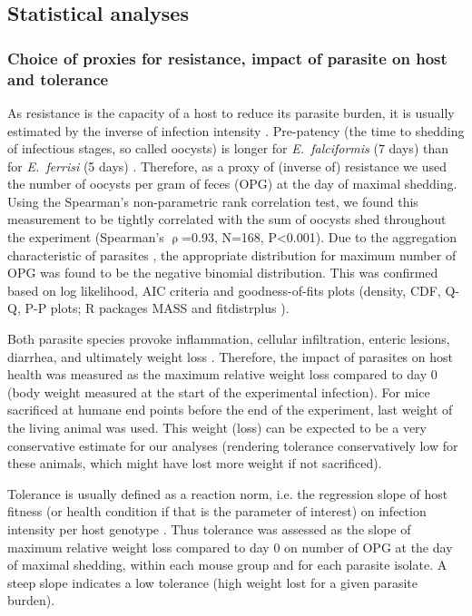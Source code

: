 \subsection{Statistical analyses}

\subsubsection{Choice of proxies for resistance, impact of parasite on host and tolerance}
As resistance is the capacity of a host to reduce its parasite burden, it is usually estimated by the inverse of infection intensity \citep{raaberg_decomposing_2009}. Pre-patency (the time to shedding of infectious stages, so called oocysts) is longer for \textit{E.~falciformis} (7 days) than for \textit{E.~ferrisi} (5 days) \citep{al-khlifeh_eimeria_2019}. Therefore, as a proxy of (inverse of) resistance we used the number of oocysts per gram of feces (OPG) at the day of maximal shedding. Using the Spearman's non-parametric rank correlation test, we found this measurement to be tightly correlated with the sum of oocysts shed throughout the experiment (Spearman's $\uprho$=0.93, N=168, P<0.001). Due to the aggregation characteristic of parasites \citep{shaw_patterns_1995}, the appropriate distribution for maximum number of OPG was found to be the negative binomial distribution. This was confirmed based on log likelihood, AIC criteria and goodness-of-fits plots (density, CDF, Q-Q, P-P plots; R packages MASS \citep{venables_modern_2002} and fitdistrplus \citep{delignette-muller_fitdistrplus_2015}). \par

Both parasite species provoke inflammation, cellular infiltration, enteric lesions, diarrhea, and ultimately weight loss \citep{ankrom_life_1975, ehret_dual_2017, schito_comparison_1996, al-khlifeh_eimeria_2019}. Therefore, the impact of parasites on host health was measured as the maximum relative weight loss compared to day 0 (body weight measured at the start of the experimental infection). For mice sacrificed at humane end points before the end of the experiment, last weight of the living animal was used. This weight (loss) can be expected to be a very conservative estimate for our analyses (rendering tolerance conservatively low for these animals, which might have lost more weight if not sacrificed). \par

Tolerance is usually defined as a reaction norm, i.e. the regression slope of host fitness (or health condition if that is the parameter of interest) on infection intensity per host genotype \citep{Simms2000, raaberg_decomposing_2009}. Thus tolerance was assessed as the slope of maximum relative weight loss compared to day 0 on number of OPG at the day of maximal shedding, within each mouse group and for each parasite isolate. A steep slope indicates a low tolerance (high weight lost for a given parasite burden).

